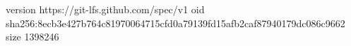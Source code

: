 version https://git-lfs.github.com/spec/v1
oid sha256:8ecb3e427b764c81970064715cfd0a79139fd15afb2caf87940179dc086c9662
size 1398246
